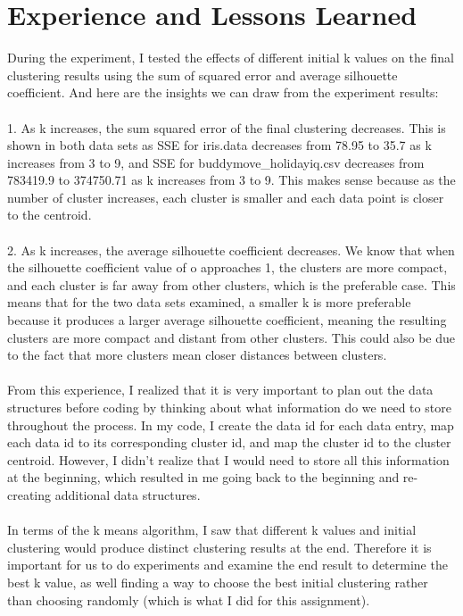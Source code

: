 \documentclass[9pt,twoside]{exam}
\begin{document}
\section*{Experience and Lessons Learned}
During the experiment, I tested the effects of different initial k values on the final clustering results using the sum of squared error and average silhouette coefficient. And here are the insights we can draw from the experiment results: \\\\
1. As k increases, the sum squared error of the final clustering decreases. This is shown in both data sets as SSE for iris.data decreases from 78.95 to 35.7 as k increases from 3 to 9, and SSE for buddymove\_holidayiq.csv decreases from 783419.9 to 374750.71 as k increases from 3 to 9.  This makes sense because as the number of cluster increases, each cluster is smaller and each data point is closer to the centroid. \\\\
2. As k increases, the average silhouette coefficient decreases. We know that when the silhouette coefficient value of o approaches 1, the clusters are more compact, and each cluster is far away from other clusters, which is the preferable case. This means that for the two data sets examined, a smaller k is more preferable because it produces a larger average silhouette coefficient, meaning the resulting clusters are more compact and distant from other clusters. This could also be due to the fact that more clusters mean closer distances between clusters. \\\\
From this experience, I realized that it is very important to plan out the data structures before coding by thinking about what information do we need to store throughout the process. In my code, I create the data id for each data entry, map each data id to its corresponding cluster id, and map the cluster id to the cluster centroid. However, I didn't realize that I would need to store all this information at the beginning, which resulted in me going back to the beginning and re-creating additional data structures. \\\\
In terms of the k means algorithm, I saw that different k values and initial clustering would produce distinct clustering results at the end. Therefore it is important for us to do experiments and examine the end result to determine the best k value, as well finding a way to choose the best initial clustering rather than choosing randomly (which is what I did for this assignment).
\end{document}
